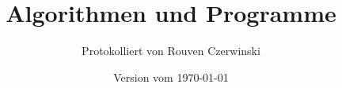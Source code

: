 \documentclass[12pt,a4paper]{scrartcl}
\title{Algorithmen und Programme}
\author{Protokolliert von Rouven Czerwinski}
\date{Version vom \today}                                           %
\begin{document}
\maketitle
\newpage~\newpage

\tableofcontents
\listoftables
\newpage


\newpage

\newpage

\end{document}
